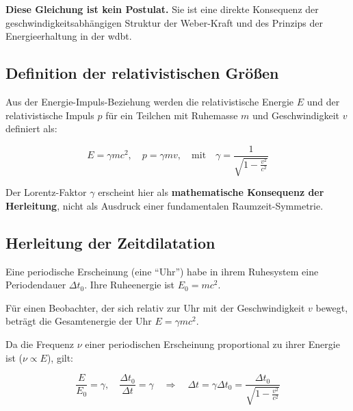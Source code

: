 \textbf{Diese Gleichung ist kein Postulat.} Sie ist eine direkte Konsequenz der geschwindigkeitsabhängigen Struktur der Weber-Kraft und des Prinzips der Energieerhaltung in der \gls{wdbt}.

\subsection{Definition der relativistischen Größen}
Aus der Energie-Impuls-Beziehung werden die relativistische Energie $E$ und der relativistische Impuls $p$ für ein Teilchen mit Ruhemasse $m$ und Geschwindigkeit $v$ definiert als:

\begin{equation}
    \label{eq:relativistische_energie}
    E = \gamma m c^2, \quad p = \gamma m v, \quad \text{mit} \quad \gamma = \frac{1}{\sqrt{1 - \frac{v^2}{c^2}}}
\end{equation}

Der Lorentz-Faktor $\gamma$ erscheint hier als \textbf{mathematische Konsequenz der Herleitung}, nicht als Ausdruck einer fundamentalen Raumzeit-Symmetrie.

\subsection{Herleitung der Zeitdilatation}
Eine periodische Erscheinung (eine \enquote{Uhr}) habe in ihrem Ruhesystem eine Periodendauer $\Delta t_0$. Ihre Ruheenergie ist $E_0 = mc^2$.

Für einen Beobachter, der sich relativ zur Uhr mit der Geschwindigkeit $v$ bewegt, beträgt die Gesamtenergie der Uhr $E = \gamma mc^2$.

Da die Frequenz $\nu$ einer periodischen Erscheinung proportional zu ihrer Energie ist ($\nu \propto E$), gilt:

\begin{equation}
    \label{eq:zeitdilatation}
    \frac{E}{E_0} = \gamma, \quad \frac{\Delta t_0}{\Delta t} = \gamma \quad \Rightarrow \quad \Delta t = \gamma \Delta t_0 = \frac{\Delta t_0}{\sqrt{1 - \frac{v^2}{c^2}}}
\end{equation}

